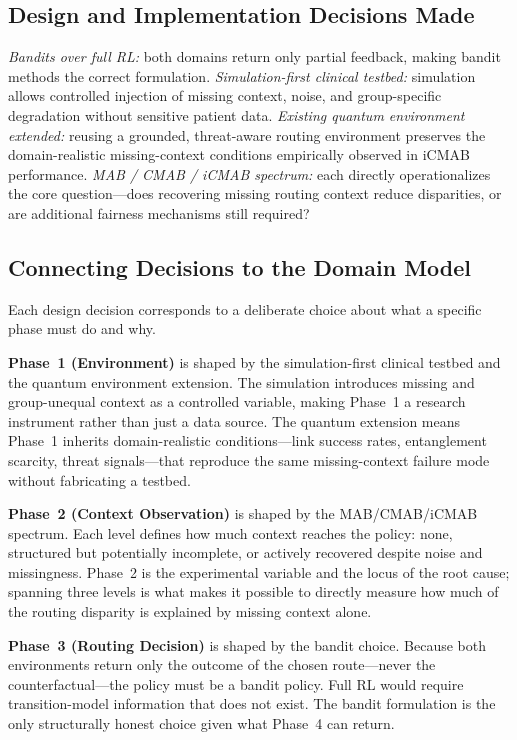\documentclass{IEEEtran}
\begin{document}
\subsection{Design and Implementation Decisions Made}
\textit{Bandits over full RL:} both domains return only partial feedback,
making bandit methods the correct formulation. \textit{Simulation-first
clinical testbed:} simulation allows controlled injection of missing context,
noise, and group-specific degradation without sensitive patient data.
\textit{Existing quantum environment extended:} reusing a grounded,
threat-aware routing environment preserves the domain-realistic missing-context
conditions empirically observed in iCMAB performance. \textit{MAB / CMAB /
iCMAB spectrum:} each directly operationalizes the core
question---does recovering missing routing context reduce disparities, or are
additional fairness mechanisms still required?

\subsection{Connecting Decisions to the Domain Model}
Each design decision corresponds to a deliberate choice about what a specific
phase must do and why.

\textbf{Phase~1 (Environment)} is shaped by the simulation-first clinical
testbed and the quantum environment extension. The simulation introduces missing and group-unequal context as a controlled variable, making
Phase~1 a research instrument rather than just a data source. The quantum
extension means Phase~1 inherits domain-realistic conditions---link success
rates, entanglement scarcity, threat signals---that reproduce the same
missing-context failure mode without fabricating a testbed.

\textbf{Phase~2 (Context Observation)} is shaped by the MAB/CMAB/iCMAB
spectrum. Each level defines how much context reaches the policy: none,
structured but potentially incomplete, or actively recovered despite noise
and missingness. Phase~2 is the experimental variable and the locus of the
root cause; spanning three levels is what makes it possible to directly
measure how much of the routing disparity is explained by missing context
alone.

\textbf{Phase~3 (Routing Decision)} is shaped by the bandit choice. Because
both environments return only the outcome of the chosen route---never the
counterfactual---the policy must be a bandit policy. Full RL would require
transition-model information that does not exist. The bandit formulation is
the only structurally honest choice given what Phase~4 can return.
\end{document}
